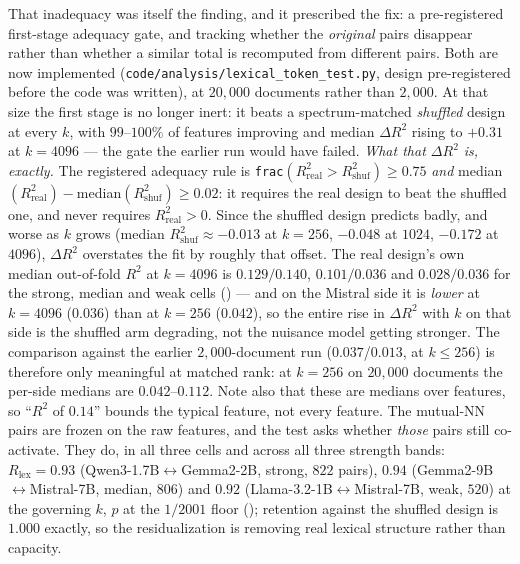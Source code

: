 That inadequacy was itself the finding, and it prescribed the fix: a pre-registered first-stage adequacy gate, and tracking whether the \emph{original} pairs disappear rather than whether a similar total is recomputed from different pairs. Both are now implemented (\texttt{code/analysis/lexical\_token\_test.py}, design pre-registered before the code was written), at $20{,}000$ documents rather than $2{,}000$. At that size the first stage is no longer inert: it beats a spectrum-matched \emph{shuffled} design at every $k$, with $99$--$100\%$ of features improving and median $\Delta R^2$ rising to $+0.31$ at $k{=}4096$ --- the gate the earlier run would have failed. \emph{What that $\Delta R^2$ is, exactly.} The registered adequacy rule is \texttt{frac}$(R^2_{\text{real}}>R^2_{\text{shuf}})\ge0.75$ \emph{and} median$(R^2_{\text{real}})-$median$(R^2_{\text{shuf}})\ge0.02$: it requires the real design to beat the shuffled one, and never requires $R^2_{\text{real}}>0$. Since the shuffled design predicts badly, and worse as $k$ grows (median $R^2_{\text{shuf}}\approx-0.013$ at $k{=}256$, $-0.048$ at $1024$, $-0.172$ at $4096$), $\Delta R^2$ overstates the fit by roughly that offset. The real design's own median out-of-fold $R^2$ at $k{=}4096$ is $0.129/0.140$, $0.101/0.036$ and $0.028/0.036$ for the strong, median and weak cells () --- and on the Mistral side it is \emph{lower} at $k{=}4096$ ($0.036$) than at $k{=}256$ ($0.042$), so the entire rise in $\Delta R^2$ with $k$ on that side is the shuffled arm degrading, not the nuisance model getting stronger. The comparison against the earlier $2{,}000$-document run ($0.037$/$0.013$, at $k\le256$) is therefore only meaningful at matched rank: at $k{=}256$ on $20{,}000$ documents the per-side medians are $0.042$--$0.112$. Note also that these are medians over features, so ``$R^2$ of $0.14$'' bounds the typical feature, not every feature. The mutual-NN pairs are frozen on the raw features, and the test asks whether \emph{those} pairs still co-activate. They do, in all three cells and across all three strength bands: $R_{\text{lex}}=0.93$ (Qwen3-1.7B$\leftrightarrow$Gemma2-2B, strong, $822$ pairs), $0.94$ (Gemma2-9B$\leftrightarrow$Mistral-7B, median, $806$) and $0.92$ (Llama-3.2-1B$\leftrightarrow$Mistral-7B, weak, $520$) at the governing $k$, $p$ at the $1/2001$ floor (); retention against the shuffled design is $1.000$ exactly, so the residualization is removing real lexical structure rather than capacity.


